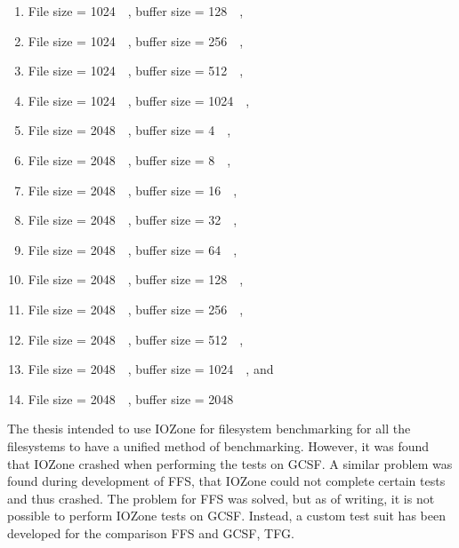\begin{enumerate}
\begin{enumerate}
	\item File size = \SI{1024}{\kilo\byte}, buffer size = \SI{128}{\kilo\byte},
	\item File size = \SI{1024}{\kilo\byte}, buffer size = \SI{256}{\kilo\byte},
	\item File size = \SI{1024}{\kilo\byte}, buffer size = \SI{512}{\kilo\byte},
	\item File size = \SI{1024}{\kilo\byte}, buffer size = \SI{1024}{\kilo\byte},
	\item File size = \SI{2048}{\kilo\byte}, buffer size = \SI{4}{\kilo\byte},
	\item File size = \SI{2048}{\kilo\byte}, buffer size = \SI{8}{\kilo\byte},
	\item File size = \SI{2048}{\kilo\byte}, buffer size = \SI{16}{\kilo\byte},
	\item File size = \SI{2048}{\kilo\byte}, buffer size = \SI{32}{\kilo\byte},
	\item File size = \SI{2048}{\kilo\byte}, buffer size = \SI{64}{\kilo\byte},
	\item File size = \SI{2048}{\kilo\byte}, buffer size = \SI{128}{\kilo\byte},
	\item File size = \SI{2048}{\kilo\byte}, buffer size = \SI{256}{\kilo\byte},
	\item File size = \SI{2048}{\kilo\byte}, buffer size = \SI{512}{\kilo\byte},
	\item File size = \SI{2048}{\kilo\byte}, buffer size = \SI{1024}{\kilo\byte}, and
	\item File size = \SI{2048}{\kilo\byte}, buffer size = \SI{2048}{\kilo\byte}
\end{enumerate}

The thesis intended to use IOZone for filesystem benchmarking for all the filesystems to have a unified method of benchmarking. However, it was found that IOZone crashed when performing the tests on GCSF. A similar problem was found during development of FFS, that IOZone could not complete certain tests and thus crashed. The problem for FFS was solved, but as of writing, it is not possible to perform IOZone tests on GCSF. Instead, a custom test suit has been developed for the comparison FFS and GCSF, TFG. 



\end{enumerate}
